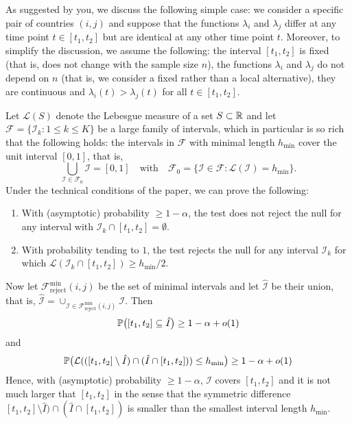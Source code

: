 \documentclass[a4paper,12pt]{article}
\begin{document}
\begin{enumerate}[label=(\arabic*),leftmargin=0.7cm]
As suggested by you, we discuss the following simple case: we consider a specific pair of countries $(i,j)$ and suppose that the functions $\lambda_i$ and $\lambda_j$ differ at any time point $t \in [t_1,t_2]$ but are identical at any other time point $t$. Moreover, to simplify the discussion, we assume the following: the interval $[t_1,t_2]$ is fixed (that is, does not change with the sample size $n$), the functions $\lambda_i$ and $\lambda_j$ do not depend on $n$ (that is, we consider a fixed rather than a local alternative), they are continuous and $\lambda_i(t) > \lambda_j(t)$ for all $t \in [t_1,t_2]$.

Let $\mathcal{L}(S)$ denote the Lebesgue measure of a set $S \subset \mathbb{R}$ and let $\mathcal{F} = \{\mathcal{I}_k: 1 \le k \le K\}$ be a large family of intervals, which in particular is so rich that the following holds: the intervals in $\mathcal{F}$ with minimal length $h_{\min}$ cover the unit interval $[0,1]$, that is, 
\[ \bigcup_{\mathcal{I} \in \mathcal{F}_0} \mathcal{I} = [0,1] \quad \text{with} \quad \mathcal{F}_0 = \{ \mathcal{I} \in \mathcal{F}: \mathcal{L}(\mathcal{I}) = h_{\min} \}. \] 
Under the technical conditions of the paper, we can prove the following: 
\begin{enumerate}[label=(\roman*)]
\item With (asymptotic) probability $\ge 1-\alpha$, the test does not reject the null for any interval with $\mathcal{I}_k \cap [t_1,t_2] = \emptyset$. 
\item With probability tending to $1$, the test rejects the null for any interval $\mathcal{I}_k$ for which $\mathcal{L}(\mathcal{I}_k \cap [t_1,t_2]) \ge h_{\min}/2$.
\end{enumerate}
Now let $\mathcal{F}_{\text{reject}}^{\text{min}}(i,j)$ be the set of minimal intervals and let $\hat{\mathcal{I}}$ be their union, that is, $\hat{\mathcal{I}} = \cup_{\mathcal{I} \in \mathcal{F}_{\text{reject}}^{\min}(i,j)} \mathcal{I}$. Then
\[ \mathbb{P} \big( [t_1,t_2] \subseteq \hat{I} \big) \ge 1 - \alpha + o(1) \]
and 
\[ \mathbb{P} \big( \mathcal{L} (([t_1,t_2] \setminus \hat{I}) \cap (\hat{I} \cap [t_1,t_2])) \le h_{\min} \big) \ge 1 - \alpha + o(1) \]
Hence, with (asymptotic) probability $\ge 1-\alpha$, $\mathcal{I}$ covers $[t_1,t_2]$ and it is not much larger that $[t_1,t_2]$ in the sense that the symmetric difference $[t_1,t_2] \setminus \hat{I}) \cap (\hat{I} \cap [t_1,t_2])$ is smaller than the smallest interval length $h_{\min}$.


\end{enumerate}
\end{document}
